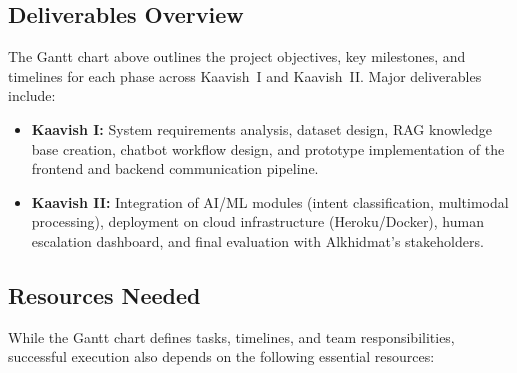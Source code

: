 \subsection*{Deliverables Overview}
The Gantt chart above outlines the project objectives, key milestones, and timelines for each phase across Kaavish~I and Kaavish~II. Major deliverables include:
\begin{itemize}
    \item \textbf{Kaavish I:} System requirements analysis, dataset design, RAG knowledge base creation, chatbot workflow design, and prototype implementation of the frontend and backend communication pipeline.
    \item \textbf{Kaavish II:} Integration of AI/ML modules (intent classification, multimodal processing), deployment on cloud infrastructure (Heroku/Docker), human escalation dashboard, and final evaluation with Alkhidmat’s stakeholders.
\end{itemize}

\subsection*{Resources Needed}
While the Gantt chart defines tasks, timelines, and team responsibilities, successful execution also depends on the following essential resources:

